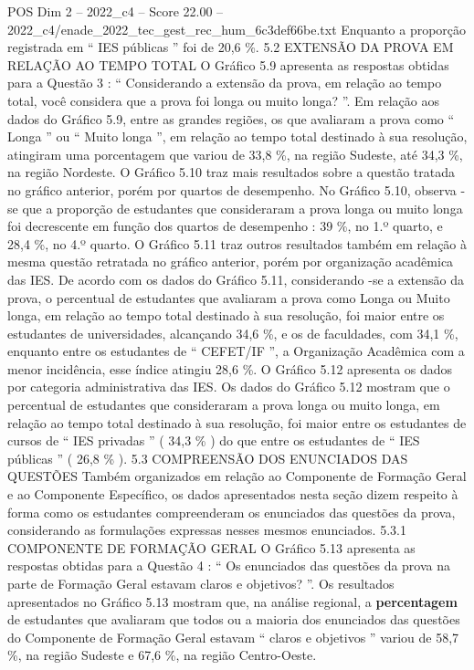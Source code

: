 \begin{textsample}{POS Dim 2 – 2022\_c4 – Score 22.00 – 2022\_c4/enade\_2022\_tec\_gest\_rec\_hum\_6c3def66be.txt}
Enquanto a proporção registrada em “ IES públicas ” foi de 20,6 \%. 5.2 EXTENSÃO DA PROVA EM RELAÇÃO AO TEMPO TOTAL O Gráfico 5.9 apresenta as respostas obtidas para a Questão 3 : “ Considerando a extensão da prova, em relação ao tempo total, você considera que a prova foi longa ou muito longa? ”.
Em relação aos dados do Gráfico 5.9, entre as grandes regiões, os que avaliaram a prova como “ Longa ” ou “ Muito longa ”, em relação ao tempo total destinado à sua resolução, atingiram uma porcentagem que variou de 33,8 \%, na região Sudeste, até 34,3 \%, na região Nordeste.
O Gráfico 5.10 traz mais resultados sobre a questão tratada no gráfico anterior, porém por quartos de desempenho.
No Gráfico 5.10, observa -se que a proporção de estudantes que consideraram a prova longa ou muito longa foi decrescente em função dos quartos de desempenho : 39 \%, no 1.º quarto, e 28,4 \%, no 4.º quarto.
O Gráfico 5.11 traz outros resultados também em relação à mesma questão retratada no gráfico anterior, porém por organização acadêmica das IES.
De acordo com os dados do Gráfico 5.11, considerando -se a extensão da prova, o percentual de estudantes que avaliaram a prova como Longa ou Muito longa, em relação ao tempo total destinado à sua resolução, foi maior entre os estudantes de universidades, alcançando 34,6 \%, e os de faculdades, com 34,1 \%, enquanto entre os estudantes de “ CEFET/IF ”, a Organização Acadêmica com a menor incidência, esse índice atingiu 28,6 \%.
O Gráfico 5.12 apresenta os dados por categoria administrativa das IES.
Os dados do Gráfico 5.12 mostram que o percentual de estudantes que consideraram a prova longa ou muito longa, em relação ao tempo total destinado à sua resolução, foi maior entre os estudantes de cursos de “ IES privadas ” ( 34,3 \% ) do que entre os estudantes de “ IES públicas ” ( 26,8 \% ). 5.3 COMPREENSÃO DOS ENUNCIADOS DAS QUESTÕES Também organizados em relação ao Componente de Formação Geral e ao Componente Específico, os dados apresentados nesta seção dizem respeito à forma como os estudantes compreenderam os enunciados das questões da prova, considerando as formulações expressas nesses mesmos enunciados. 5.3.1 COMPONENTE DE FORMAÇÃO GERAL O Gráfico 5.13 apresenta as respostas obtidas para a Questão 4 : “ Os enunciados das questões da prova na parte de Formação Geral estavam claros e objetivos? ”.
Os resultados apresentados no Gráfico 5.13 mostram que, na análise regional, a \textbf{percentagem} de estudantes que avaliaram que todos ou a maioria dos enunciados das questões do Componente de Formação Geral estavam “ claros e objetivos ” variou de 58,7 \%, na região Sudeste e 67,6 \%, na região Centro-Oeste.

\end{textsample}
